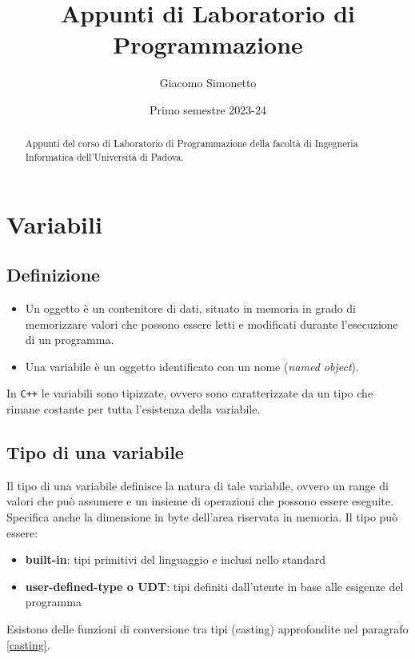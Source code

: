 \documentclass[a4paper]{article}
\title{Appunti di Laboratorio di Programmazione}
\author{Giacomo Simonetto}
\date{Primo semestre 2023-24}
\begin{document}
\maketitle
\begin{abstract}
	Appunti del corso di Laboratorio di Programmazione della facoltà di Ingegneria Informatica dell'Università di Padova.
\end{abstract}

\vspace{12em}
\begin{center}
	\large \textbf{}
\end{center}

\newpage

\tableofcontents

\newpage




\section{Variabili}
\subsection*{Definizione}
\begin{itemize}
	\item Un oggetto è un contenitore di dati, situato in memoria in grado di memorizzare valori che possono	essere letti e
	modificati durante l'esecuzione di un programma.
	\item Una variabile è un oggetto identificato con un nome (\textit{named object}).
\end{itemize}
In \verb|C++| le variabili sono tipizzate, ovvero sono caratterizzate  da un tipo che rimane costante per tutta l'esistenza della
variabile.

\subsection{Tipo di una variabile}
Il tipo di una variabile definisce la natura di tale variabile, ovvero un range di valori che può assumere e un insieme di
operazioni che possono essere eseguite. Specifica anche la dimensione in byte dell'area riservata in memoria. Il tipo può
essere:
\begin{itemize}
	\item \textbf{built-in}: tipi primitivi del linguaggio e inclusi nello standard
	\item \textbf{user-defined-type o UDT}: tipi definiti dall'utente in base alle esigenze del programma
\end{itemize}
Esistono delle funzioni di conversione tra tipi (casting) approfondite nel paragrafo \ref{casting}.
\end{document}
